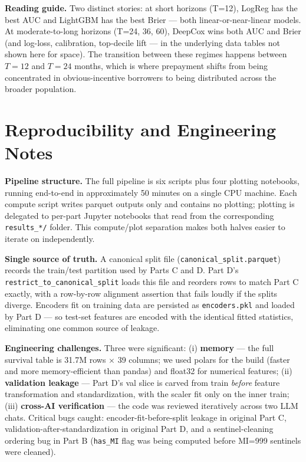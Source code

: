 \documentclass[11pt,a4paper]{article}
\begin{document}
\textbf{Reading guide.} Two distinct stories: at short horizons (T=12), LogReg has the best AUC and LightGBM has the best Brier --- both linear-or-near-linear models. At moderate-to-long horizons (T=24, 36, 60), DeepCox wins both AUC and Brier (and log-loss, calibration, top-decile lift --- in the underlying data tables not shown here for space). The transition between these regimes happens between $T{=}12$ and $T{=}24$ months, which is where prepayment shifts from being concentrated in obvious-incentive borrowers to being distributed across the broader population.

\section{Reproducibility and Engineering Notes}

\textbf{Pipeline structure.} The full pipeline is six scripts plus four plotting notebooks, running end-to-end in approximately 50 minutes on a single CPU machine. Each compute script writes parquet outputs only and contains no plotting; plotting is delegated to per-part Jupyter notebooks that read from the corresponding \texttt{results\_*/} folder. This compute/plot separation makes both halves easier to iterate on independently.

\textbf{Single source of truth.} A canonical split file (\texttt{canonical\_split.parquet}) records the train/test partition used by Parts C and D. Part D's \texttt{restrict\_to\_canonical\_split} loads this file and reorders rows to match Part C exactly, with a row-by-row alignment assertion that fails loudly if the splits diverge. Encoders fit on training data are persisted as \texttt{encoders.pkl} and loaded by Part D --- so test-set features are encoded with the identical fitted statistics, eliminating one common source of leakage.

\textbf{Engineering challenges.} Three were significant: (i) \textbf{memory} --- the full survival table is 31.7M rows $\times$ 39 columns; we used polars for the build (faster and more memory-efficient than pandas) and float32 for numerical features; (ii) \textbf{validation leakage} --- Part D's val slice is carved from train \emph{before} feature transformation and standardization, with the scaler fit only on the inner train; (iii) \textbf{cross-AI verification} --- the code was reviewed iteratively across two LLM chats. Critical bugs caught: encoder-fit-before-split leakage in original Part C, validation-after-standardization in original Part D, and a sentinel-cleaning ordering bug in Part B (\texttt{has\_MI} flag was being computed before MI=999 sentinels were cleaned).
\end{document}
